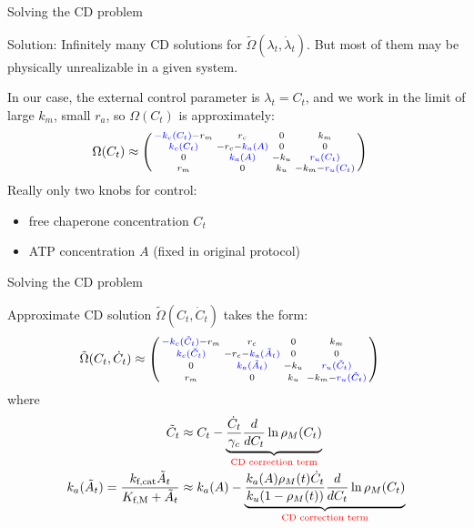 \documentclass{beamer}
\begin{document}
\begin{frame}{Solving the CD problem}
  
  {\color{red} Solution:} Infinitely many CD solutions for $\tilde{\Omega}(\lambda_t,\dot\lambda_t)$.  But most of them may be physically unrealizable in a given system.

  \pause
  \vspace{1em} In our case, the external control parameter is
  $\lambda_t = C_t$, and we work in the limit of large $k_m$, small
  $r_a$, so $\Omega(C_t)$ is approximately:
    \[
    \begin{split}
&\Omega(C_t) \approx \left(\begin{smallmatrix} 
{\color{blue} -k_c(C_t)} -r_m & r_c & 0 & k_m \\ 
{\color{blue} k_c(C_t)} & -r_c -{\color{blue} k_a(A)} & 0 & 0\\
0 & {\color{blue} k_a(A)} & - k_u & {\color{blue} r_u(C_t)}\\
r_m & 0 & k_u & -k_m - {\color{blue} r_u(C_t)}
      \end{smallmatrix}\right)
      \end{split}
    \]
    Really only {\color{blue} two knobs for control:}
    \begin{itemize}
      \item free chaperone concentration $C_t$\\
      \item ATP concentration $A$ (fixed in original protocol)
     \end{itemize}

\end{frame}

\begin{frame}{Solving the CD problem}

  Approximate CD solution $\tilde{\Omega}(C_t,\dot{C}_t)$ takes the form:
    \[
    \begin{split}
&\tilde{\Omega}(C_t,\dot{C}_t) \approx \left(\begin{smallmatrix} 
{\color{blue} -k_c(\tilde{C}_t)} -r_m & r_c & 0 & k_m \\ 
{\color{blue} k_c(\tilde{C}_t)} & -r_c -{\color{blue} k_a(\tilde{A}_t)} & 0 & 0\\
0 & {\color{blue} k_a(\tilde{A}_t)} & - k_u & {\color{blue} r_u(\tilde{C}_t)}\\
r_m & 0 & k_u & -k_m - {\color{blue} r_u(\tilde{C}_t)}
      \end{smallmatrix}\right)
      \end{split}
    \]
    where
    \[
    \begin{split}
    \tilde{C}_t &\approx C_t -\underbrace{\frac{\dot{C}_t}{\gamma_c}\frac{d}{d C_t}\ln \rho_M(C_t)}_{\text{\color{red} CD correction term}}\\
    k_a(\tilde{A}_t) = \frac{k_\text{f,cat} \tilde{A}_t}{K_\text{f,M}+\tilde{A}_t} &\approx k_a(A) - \underbrace{\frac{k_a(A) \rho_M(t) \dot{C}_t}{k_u(1-\rho_M(t))}\frac{d}{dC_t}\ln \rho_M(C_t)}_{\text{\color{red} CD correction term}}
    \end{split}
    \]

      
\end{frame}
\end{document}
